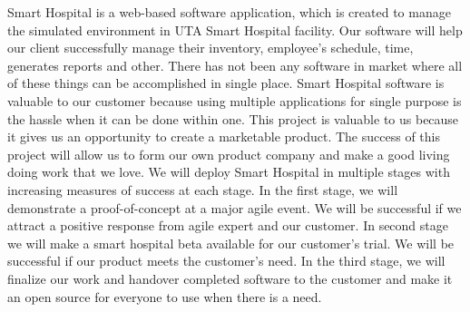 Smart Hospital is a web-based software application, which is created to manage the simulated environment in UTA Smart Hospital facility. Our software will help our client successfully manage their inventory, employee's schedule, time, generates reports  and other. There has not been any software in market where all of these things can be accomplished in single place. Smart Hospital software is valuable to our customer because using multiple applications for single purpose is the hassle when it can be done within one. This project is valuable to us because it gives us an opportunity to create a marketable product. The success of this project will allow us to form our own product company and make a good living doing work that we love. We will deploy Smart Hospital in multiple stages with increasing measures of success at each stage. In the first stage, we will demonstrate a proof-of-concept at a major agile event. We will be successful if we attract a positive response from agile expert and our customer. In second stage we will make a smart hospital beta available for our customer’s trial. We will be successful if our product meets the customer’s need. In the third stage, we will finalize our work and handover completed software to the customer and make it an open source for everyone to use when there is a need.
